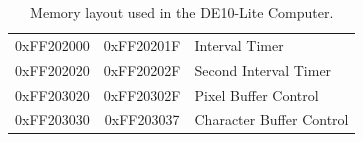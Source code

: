 \documentclass[11pt, twoside, pdftex]{article}
\newcommand{\commonFiles}{../../../common/doc}
\newcommand{\templatePath}{../../../common/templates}
\begin{document}
\begin{table}[h]
\begin{center}
\begin{tabular}{c|c|l}
            0xFF202000
            & 0xFF20201F
            & Interval Timer
        \\  
            0xFF202020
            & 0xFF20202F
            & Second Interval Timer
        \\
            0xFF203020
            & 0xFF20302F
            & Pixel Buffer Control
        \\
            0xFF203030
            & 0xFF203037
            & Character Buffer Control
        \\
    \end{tabular}
    \caption{Memory layout used in the DE10-Lite Computer.}
    \label{tab:memorylayout}
    \end{center}
\end{table}

\newpage


\clearpage







\newpage



\end{document}

